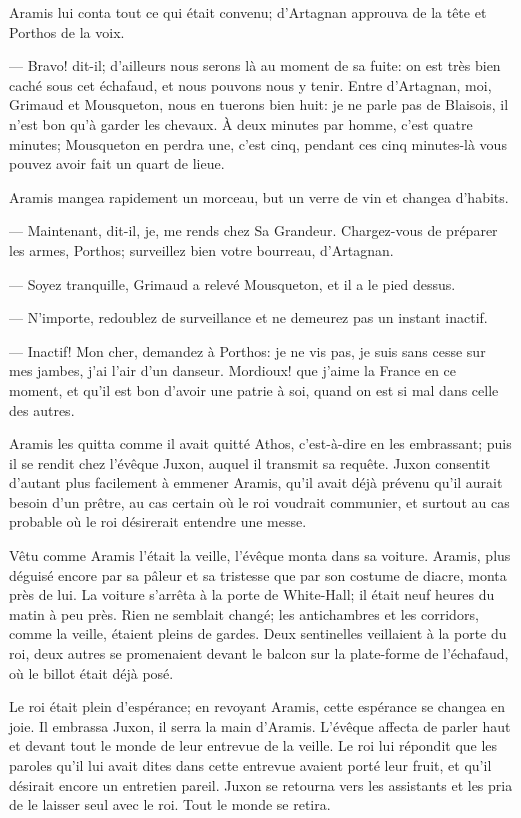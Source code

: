 Aramis lui conta tout ce qui était convenu; d'Artagnan approuva de la tête et Porthos de la voix.

— Bravo! dit-il; d'ailleurs nous serons là au moment de sa fuite: on est très bien caché sous cet échafaud, et nous pouvons nous y tenir. Entre d'Artagnan, moi, Grimaud et Mousqueton, nous en tuerons bien huit: je ne parle pas de Blaisois, il n'est bon qu'à garder les chevaux. À deux minutes par homme, c'est quatre minutes; Mousqueton en perdra une, c'est cinq, pendant ces cinq minutes-là vous pouvez avoir fait un quart de lieue.

Aramis mangea rapidement un morceau, but un verre de vin et changea d'habits.

— Maintenant, dit-il, je, me rends chez Sa Grandeur. Chargez-vous de préparer les armes, Porthos; surveillez bien votre bourreau, d'Artagnan.

— Soyez tranquille, Grimaud a relevé Mousqueton, et il a le pied dessus.

— N'importe, redoublez de surveillance et ne demeurez pas un instant inactif.

— Inactif! Mon cher, demandez à Porthos: je ne vis pas, je suis sans cesse sur mes jambes, j'ai l'air d'un danseur. Mordioux! que j'aime la France en ce moment, et qu'il est bon d'avoir une patrie à soi, quand on est si mal dans celle des autres.

Aramis les quitta comme il avait quitté Athos, c'est-à-dire en les embrassant; puis il se rendit chez l'évêque Juxon, auquel il transmit sa requête. Juxon consentit d'autant plus facilement à emmener Aramis, qu'il avait déjà prévenu qu'il aurait besoin d'un prêtre, au cas certain où le roi voudrait communier, et surtout au cas probable où le roi désirerait entendre une messe.

Vêtu comme Aramis l'était la veille, l'évêque monta dans sa voiture. Aramis, plus déguisé encore par sa pâleur et sa tristesse que par son costume de diacre, monta près de lui. La voiture s'arrêta à la porte de White-Hall; il était neuf heures du matin à peu près. Rien ne semblait changé; les antichambres et les corridors, comme la veille, étaient pleins de gardes. Deux sentinelles veillaient à la porte du roi, deux autres se promenaient devant le balcon sur la plate-forme de l'échafaud, où le billot était déjà posé.

Le roi était plein d'espérance; en revoyant Aramis, cette espérance se changea en joie. Il embrassa Juxon, il serra la main d'Aramis. L'évêque affecta de parler haut et devant tout le monde de leur entrevue de la veille. Le roi lui répondit que les paroles qu'il lui avait dites dans cette entrevue avaient porté leur fruit, et qu'il désirait encore un entretien pareil. Juxon se retourna vers les assistants et les pria de le laisser seul avec le roi. Tout le monde se retira.


